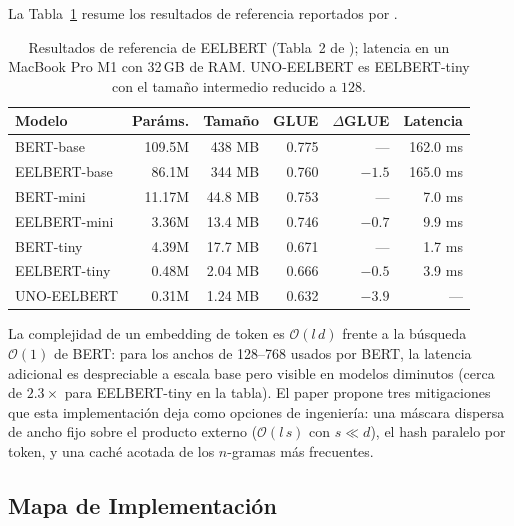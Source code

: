 La Tabla~\ref{tab:eelbert-results-es} resume los resultados de referencia reportados por \citet{cohn_eelbert_2023}.

\begin{table}[H]
\centering
\small
\begin{tabular}{@{}l r r r r r@{}}
\toprule
\textbf{Modelo} & \textbf{Paráms.} & \textbf{Tamaño} & \textbf{GLUE} & \textbf{$\Delta$GLUE} & \textbf{Latencia} \\
\midrule
BERT-base & 109.5M & 438 MB & 0.775 & --- & 162.0 ms \\
EELBERT-base & 86.1M & 344 MB & 0.760 & $-1.5$ & 165.0 ms \\
BERT-mini & 11.17M & 44.8 MB & 0.753 & --- & 7.0 ms \\
EELBERT-mini & 3.36M & 13.4 MB & 0.746 & $-0.7$ & 9.9 ms \\
BERT-tiny & 4.39M & 17.7 MB & 0.671 & --- & 1.7 ms \\
EELBERT-tiny & 0.48M & 2.04 MB & 0.666 & $-0.5$ & 3.9 ms \\
UNO-EELBERT & 0.31M & 1.24 MB & 0.632 & $-3.9$ & --- \\
\bottomrule
\end{tabular}
\caption{Resultados de referencia de EELBERT (Tabla~2 de \citealp{cohn_eelbert_2023}); latencia en un MacBook Pro M1 con 32\,GB de RAM. UNO-EELBERT es EELBERT-tiny con el tamaño intermedio reducido a $128$.}
\label{tab:eelbert-results-es}
\end{table}

La complejidad de un embedding de token es $\mathcal{O}(l\,d)$ frente a la búsqueda $\mathcal{O}(1)$ de BERT: para los anchos de 128--768 usados por BERT, la latencia adicional es despreciable a escala base pero visible en modelos diminutos (cerca de $2.3\times$ para EELBERT-tiny en la tabla). El paper propone tres mitigaciones que esta implementación deja como opciones de ingeniería: una máscara dispersa de ancho fijo sobre el producto externo ($\mathcal{O}(l\,s)$ con $s\ll d$), el hash paralelo por token, y una caché acotada de los $n$-gramas más frecuentes.

\subsection{Mapa de Implementación}

